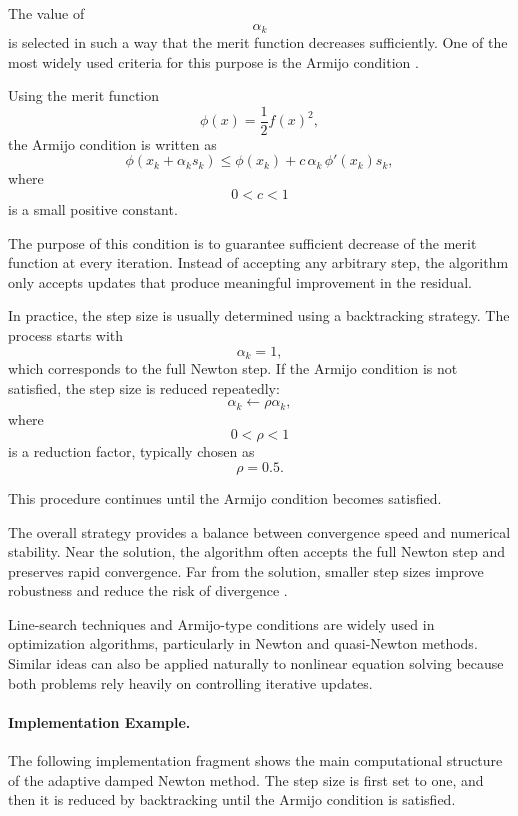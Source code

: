 The value of
\[
\alpha_k
\]
is selected in such a way that the merit function decreases sufficiently. One of the most widely used criteria for this purpose is the Armijo condition \cite{nocedal}.

Using the merit function
\[
\phi(x)=\frac{1}{2}f(x)^2,
\]
the Armijo condition is written as
\[
\phi(x_k+\alpha_k s_k)
\leq
\phi(x_k)
+
c\,\alpha_k\,\phi'(x_k)s_k,
\]
where
\[
0<c<1
\]
is a small positive constant.

The purpose of this condition is to guarantee sufficient decrease of the merit function at every iteration. Instead of accepting any arbitrary step, the algorithm only accepts updates that produce meaningful improvement in the residual.

In practice, the step size is usually determined using a backtracking strategy. The process starts with
\[
\alpha_k=1,
\]
which corresponds to the full Newton step. If the Armijo condition is not satisfied, the step size is reduced repeatedly:
\[
\alpha_k \leftarrow \rho \alpha_k,
\]
where
\[
0<\rho<1
\]
is a reduction factor, typically chosen as
\[
\rho=0.5.
\]

This procedure continues until the Armijo condition becomes satisfied.

The overall strategy provides a balance between convergence speed and numerical stability. Near the solution, the algorithm often accepts the full Newton step and preserves rapid convergence. Far from the solution, smaller step sizes improve robustness and reduce the risk of divergence \cite{nocedal, kelley}.

Line-search techniques and Armijo-type conditions are widely used in optimization algorithms, particularly in Newton and quasi-Newton methods. Similar ideas can also be applied naturally to nonlinear equation solving because both problems rely heavily on controlling iterative updates.

\paragraph{Implementation Example.}

The following implementation fragment shows the main computational structure of the adaptive damped Newton method. The step size is first set to one, and then it is reduced by backtracking until the Armijo condition is satisfied.

